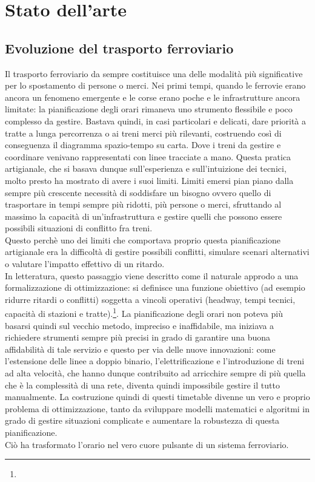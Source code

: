 \documentclass{report}
\newcommand{\fnShort}[2][]{\footnote{\footshorthand[#1]{#2}}}
\begin{document}
\chapter{Stato dell’arte}

\section{Evoluzione del trasporto ferroviario}



Il trasporto ferroviario da sempre costituisce una delle modalità più significative per lo spostamento di persone o merci. Nei primi tempi, quando le ferrovie erano ancora un fenomeno emergente e le corse erano poche e le infrastrutture ancora limitate: la pianificazione degli orari rimaneva uno strumento flessibile e poco complesso da gestire. Bastava quindi, in casi particolari e delicati, dare priorità a tratte a lunga percorrenza o ai treni merci più rilevanti, costruendo così di conseguenza il diagramma spazio-tempo su carta. Dove i treni da gestire e coordinare venivano rappresentati con linee tracciate a mano. Questa pratica artigianale, che si basava dunque sull'esperienza e sull'intuizione dei tecnici, molto presto ha mostrato di avere i suoi limiti. Limiti emersi pian piano dalla sempre più crescente necessità di soddisfare un bisogno ovvero quello di trasportare in tempi sempre più ridotti, più persone o merci, sfruttando al massimo la capacità di un'infrastruttura e gestire quelli che possono essere possibili situazioni di conflitto fra treni.  \\ Questo perchè uno dei limiti che comportava proprio questa pianificazione artigianale era la difficoltà di gestire possibili conflitti, simulare scenari alternativi o valutare l’impatto effettivo di un ritardo.  \\ In letteratura, questo passaggio viene descritto come il naturale approdo a una formalizzazione di ottimizzazione: si definisce una funzione obiettivo (ad esempio ridurre ritardi o conflitti) soggetta a vincoli operativi (headway, tempi tecnici, capacità di stazioni e tratte).\fnShort{CacchianiToth2012}.
La pianificazione degli orari non poteva più basarsi quindi sul vecchio metodo, impreciso e inaffidabile, ma iniziava a richiedere strumenti sempre più precisi in grado di garantire una buona affidabilità di tale servizio e questo per via delle nuove innovazioni: come l'estensione delle linee a doppio binario, l'elettrificazione e l'introduzione di treni ad alta velocità, che hanno dunque contribuito ad arricchire sempre di più quella che è la complessità di una rete, diventa quindi impossibile gestire il tutto manualmente. La costruzione quindi di questi timetable divenne un vero e proprio problema di ottimizzazione, tanto da sviluppare modelli matematici e algoritmi in grado di gestire situazioni complicate e aumentare la robustezza di questa pianificazione. \\ Ciò ha trasformato l'orario nel vero cuore pulsante di un sistema ferroviario.
\end{document}
